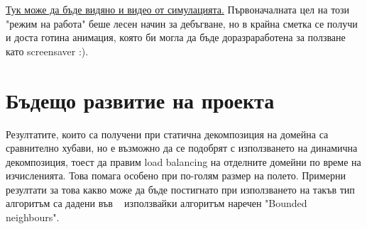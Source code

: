 \documentclass{article}
\begin{document}
\href{https://drive.google.com/file/d/1YTpRuH6WIVHf_kV8GkType7sPaLtN4y0/view?usp=sharing}{Тук може да бъде видяно и видео от симулацията.}
\bigbreak
Първоначалната цел на този "режим на работа" беше лесен начин за дебъгване,
но в крайна сметка се получи и доста готина анимация, която би могла да бъде доразраработена за ползване като screensaver :).

\section{Бъдещо развитие на проекта}
Резултатите, които са получени при статична декомпозиция на домейна са сравнително хубави,
но е възможно да се подобрят с използването на динамична декомпозиция, тоест да правим
load balancing на отделните домейни по време на изчисленията. Това помага особено при
по-голям размер на полето. Примерни резултати за това какво може да бъде постигнато при
използването на такъв тип алгоритъм са дадени във ~\cite{bounded_neighbours} използвайки алгоритъм наречен "Bounded neighbours".
{}

\end{document}
